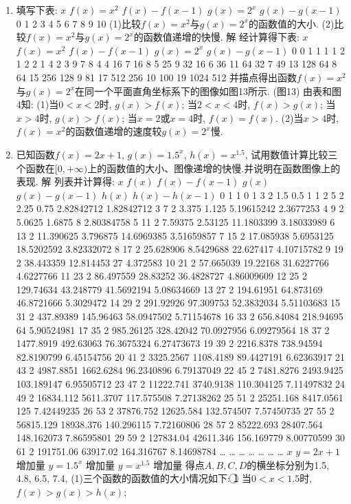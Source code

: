 \documentclass[10pt,a4paper]{article}
\begin{document}
\begin{enumerate}[1.]
\item 填写下表:
$x$	$f(x)=x^2$	$f(x)-f(x-1)$	$g(x)=2^x$	$g(x)-g(x-1)$
0				
1				
2				
3				
4				
5				
6				
7				
8				
9				
10				
(1)比较$f(x)=x^2$与$g(x)=2^x$的函数值的大小.
(2)比较$f(x)=x^2$与$g(x)=2^x$的函数值递增的快慢.
解  经计算得下表:
$x$	$f(x)=x^2$	$f(x)-f(x-1)$	$g(x)=2^x$	$g(x)-g(x-1)$
0	0		1	
1	1	1	2	1
2	2	1	4	2
3	9	7	8	4
4	16	7	16	8
5	25	9	32	16
6	36	11	64	32
7	49	13	128	64
8	64	15	256	128
9	81	17	512	256
10	100	19	1024	512
并描点得出函数$f(x)=x^2$与$g(x)=2^x$在同一个平面直角坐标系下的图像如图13所示.
(图13)
由表和图4知:
(1)当$0<x<2$时, $g(x)>f(x)$;
当$2<x<4$时, $f(x)>g(x)$;
当$x>4$时, $g(x)>f(x)$;
当$x=2$或$x=4$时, $f(x)=f(x)$.
(2)当$x>4$时, $f(x)=x^2$的函数值递增的速度较$g(x)=2^x$慢.
\item 已知函数$f(x)=2x+1$, $g(x)=1.5^x$, $h(x)=x^{1.5}$, 试用数值计算比较三个函数在$[0,+\infty)$上的函数值的大小、图像递增的快慢.并说明在函数图像上的表现.
解  列表并计算得:
$x$	$f(x)$	$f(x)-f(x-1)$	$g(x)$	$g(x)-g(x-1)$	$h(x)$	$h(x)-h(x-1)$
0	1		1		0	
1	3	2	1.5	0.5	1	1
2	5	2	2.25	0.75	2.82842712	1.82842712
3	7	2	3.375	1.125	5.19615242	2.3677253
4	9	2	5.0625	1.6875	8	2.80384758
5	11	2	7.59375	2.53125	11.1803399	3.18033989
6	13	2	11.390625	3.796875	14.6969385	3.51659857
7	15	2	17.085938	5.6953125	18.5202592	3.82332072
8	17	2	25.628906	8.5429688	22.627417	4.10715782
9	19	2	38.443359	12.814453	27	4.372583
10	21	2	57.665039	19.22168	31.6227766	4.6227766
11	23	2	86.497559	28.83252	36.4828727	4.86009609
12	25	2	129.74634	43.248779	41.5692194	5.08634669
13	27	2	194.61951	64.873169	46.8721666	5.3029472
14	29	2	291.92926	97.309753	52.3832034	5.51103683
15	31	2	437.89389	145.96463	58.0947502	5.71154678
16	33	2	656.84084	218.94695	64	5.90524981
17	35	2	985.26125	328.42042	70.0927956	6.09279564
18	37	2	1477.8919	492.63063	76.3675324	6.27473673
19	39	2	2216.8378	738.94594	82.8190799	6.45154756
20	41	2	3325.2567	1108.4189	89.4427191	6.62363917
21	43	2	4987.8851	1662.6284	96.2340896	6.79137049
22	45	2	7481.8276	2493.9425	103.189147	6.95505712
23	47	2	11222.741	3740.9138	110.304125	7.11497832
24	49	2	16834.112	5611.3707	117.575508	7.27138262
25	51	2	25251.168	8417.0561	125	7.42449235
26	53	2	37876.752	12625.584	132.574507	7.57450735
27	55	2	56815.129	18938.376	140.296115	7.72160806
28	57	2	85222.693	28407.564	148.162073	7.86595801
29	59	2	127834.04	42611.346	156.169779	8.00770599
30	61	2	191751.06	63917.02	164.316767	8.14698784
…	…	…	…	…	…	…
$x$	$y=2x+1$	增加量	$y=1.5^x$	增加量	$y=x^{1.5}$	增加量
得点$A,B,C,D$的横坐标分别为1.5, 4.8, 6.5, 7.4,
(1)三个函数的函数值的大小情况如下:
\textcircled{1} 当$0<x<1.5$时, $f(x)>g(x)>h(x)$;

\end{enumerate}
\end{document}
